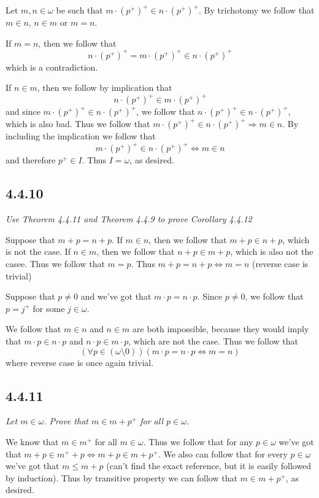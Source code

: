 \documentclass[11pt,oneside,titlepage]{book}
\DeclareMathOperator \lra {\Leftrightarrow}
\DeclareMathOperator \ra {\Rightarrow}
\begin{document}
Let $m, n \in \omega$ be such that
$m \cdot (p^+)^+ \in n \cdot (p^+)^+$. By trichotomy we
follow that $m \in n$, $n \in m$ or $m = n$.

If $m = n$, then we follow that
$$n \cdot (p^+)^+ = m \cdot (p^+)^+ \in n \cdot (p^+)^+$$
which is a contradiction.

If $n \in m$, then we follow by implication that 
$$n \cdot (p^+)^+ \in m \cdot (p^+)^+$$
and since $m \cdot (p^+)^+ \in n \cdot (p^+)^+$, we follow that
$n \cdot (p^+)^+ \in n \cdot (p^+)^+$, which is also bad. Thus we follow that
$m \cdot (p^+)^+ \in n \cdot (p^+)^+ \ra m \in n$. By including the implication we follow that
$$m \cdot (p^+)^+ \in n \cdot (p^+)^+ \lra m \in n$$
and therefore $p^+ \in I$. Thus $I = \omega$, as desired.

\subsection*{4.4.10}

\textit{Use Theorem 4.4.11 and Theorem 4.4.9 to prove Corollary 4.4.12}

Suppose that $m + p = n + p$. If $m \in n$, then we follow that $m + p \in n + p$, which
is not the case.
If $n \in m$, then we follow that $n + p \in m + p$, which is also not the casee.
Thus we follow that $m = p$. Thus $m + p = n + p \lra m = n$ (reverse case is trivial)

Suppose that $p \neq 0$ and we've got that $m \cdot p = n \cdot p$. Since $p \neq 0$, we
follow that $p = j^+$ for some $j \in \omega$.

We follow that $m \in n$ and $n \in m$ are both impossible, because they would imply
that $m \cdot p \in n \cdot p$ and $n \cdot p \in m \cdot p$, which are not the case. Thus
we follow that
$$(\forall p \in (\omega \setminus 0))(m \cdot p = n \cdot p \lra m = n)$$
where reverse case is once again trivial.

\subsection*{4.4.11}

\textit{Let $m \in \omega$. Prove that $m \in m + p^+$ for all $p \in \omega$.}

We know that $m \in m^+$ for all $m \in \omega$. Thus we follow that for any $p \in \omega$
we've got that $m + p \in m^+ + p \lra m + p \in m + p^+$. We also can follow that
for every $p \in \omega$ we've got that $m \leq m + p$ (can't find the exact reference,
but it is easily followed by induction). Thus by transitive property we can follow
that  $m \in m + p^+$, as desired.
\end{document}
